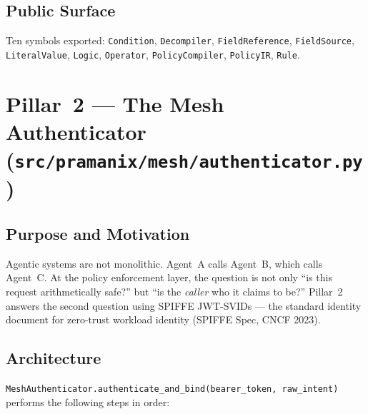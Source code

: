 \documentclass[12pt,a4paper,oneside]{report}
\newcommand{\fname}[1]{\texttt{#1}}          %
\newcommand{\code}[1]{\texttt{#1}}           %
\begin{document}
\subsection{Public Surface}

Ten symbols exported: \code{Condition}, \code{Decompiler},
\code{FieldReference}, \code{FieldSource}, \code{LiteralValue},
\code{Logic}, \code{Operator}, \code{PolicyCompiler}, \code{PolicyIR},
\code{Rule}.

\section{Pillar~2 --- The Mesh Authenticator
  (\fname{src/pramanix/mesh/authenticator.py})}

\subsection{Purpose and Motivation}

Agentic systems are not monolithic.  Agent~A calls Agent~B, which calls
Agent~C.  At the policy enforcement layer, the question is not only ``is this
request arithmetically safe?'' but ``is the \emph{caller} who it claims to
be?''  Pillar~2 answers the second question using SPIFFE JWT-SVIDs --- the
standard identity document for zero-trust workload identity (SPIFFE Spec,
CNCF 2023).

\subsection{Architecture}

\code{MeshAuthenticator.authenticate\_and\_bind(bearer\_token, raw\_intent)}
performs the following steps in order:
\end{document}
